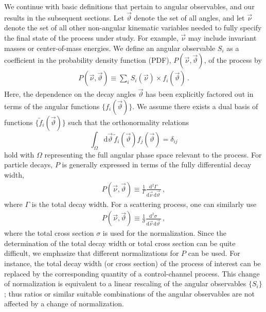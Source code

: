 \documentclass[aps,nofootinbib,preprintnumbers,prd,twocolumn]{revtex4-1}
\newcommand{\dual}[1]{\tilde{#1}}
\newcommand{\nuvec}{\vec{\nu}}
\newcommand{\rmdx}[1]{\mbox{d} #1 \,} %
\newcommand{\thvec}{\vec{\vartheta}}
\renewcommand{\theta}{\vartheta}
\begin{document}
We continue with basic definitions that pertain to angular observables, and our
results in the subsequent sections. Let $\thvec$ denote the set of all
angles, and let $\nuvec$ denote the set of all
other non-angular kinematic variables needed to fully specify the
final state of the process under study. For example, $\nuvec$ may
include invariant masses or center-of-mass energies. We define an
angular observable $S_i$ as a coefficient in the probability density
function (PDF), $P(\nuvec, \thvec)$, of the process by
\begin{align}
    \label{eq:def-P}
    P(\nuvec, \thvec) \equiv \sum_i S_i(\nuvec) \times f_i(\thvec)\,.
\end{align}
Here, the dependence on the decay angles $\thvec$ has been
explicitly factored out in terms of the angular functions
$\{f_i(\thvec)\}$. We assume there exists a dual basis of functions
$\{\dual{f}_i(\thvec)\}$ such that the orthonormality relations
\begin{equation}
    \label{eq:def-ortho-rel}
    \int_\Omega \rmdx{\vec{\theta}} \dual{f}_i(\thvec) f_j(\thvec)  = \delta_{ij}
\end{equation}
hold with $\Omega$ representing the full angular phase space relevant
to the process.  For particle decays, $P$ is generally expressed in
terms of the fully differential decay width,
\begin{align}
    \label{eq:def-P-decay}
    P(\nuvec, \thvec) \equiv \frac{1}{\Gamma}\frac{\rmdx{^{2}\Gamma}}{\rmdx{\vec\nu} \rmdx{\vec\theta}}\,,
\end{align}
where $\Gamma$ is the total decay width. For a scattering process, one can similarly use
\begin{align}
    \label{eq:def-P-scattering}
    P(\nuvec, \thvec) \equiv \frac{1}{\sigma}\frac{\rmdx{^{2}\sigma}}{\rmdx{\vec\nu} \rmdx{\vec\theta}}\,,
\end{align}
where the total cross section $\sigma$ is used for the
normalization. Since the determination of the total decay width or
total cross section can be quite difficult, we emphasize that
different normalizations for $P$ can be used.  For instance, the total
decay width (or cross section) of the process of interest can be
replaced by the corresponding quantity of a control-channel
process. This change of normalization is equivalent to a linear rescaling of
the angular observables $\lbrace S_i\rbrace$; thus ratios or similar suitable combinations
of the angular observables are not affected by a change of normalization.\\
\end{document}

